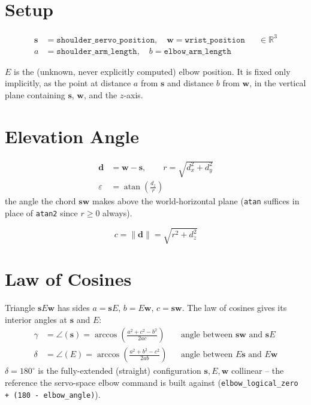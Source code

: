 \documentclass[11pt,a4paper]{article}
\begin{document}
\section{Setup}

\begin{align*}
\mathbf s &= \texttt{shoulder\_servo\_position}, \quad
\mathbf w = \texttt{wrist\_position} &&\in \mathbb R^3\\
a &= \texttt{shoulder\_arm\_length}, \quad
b = \texttt{elbow\_arm\_length}
\end{align*}

$E$ is the (unknown, never explicitly computed) elbow position. It is fixed only implicitly,
as the point at distance $a$ from $\mathbf s$ and distance $b$ from $\mathbf w$, in the vertical
plane containing $\mathbf s$, $\mathbf w$, and the $z$-axis.

\section{Elevation Angle}

\begin{align}
\mathbf d &= \mathbf w - \mathbf s, \qquad
r = \sqrt{d_x^2 + d_y^2} \\
\varepsilon &= \operatorname{atan}\!\left(\frac{d_z}{r}\right)
\end{align}
the angle the chord $\mathbf s\mathbf w$ makes above the world-horizontal plane (\texttt{atan}
suffices in place of \texttt{atan2} since $r \ge 0$ always).

\begin{equation}
c = \lVert \mathbf d \rVert = \sqrt{r^2 + d_z^2}
\end{equation}

\section{Law of Cosines}

Triangle $\mathbf s E \mathbf w$ has sides $a = \mathbf s E$, $b = E\mathbf w$,
$c = \mathbf s \mathbf w$. The law of cosines gives its interior angles at $\mathbf s$ and $E$:
\begin{align}
\gamma &= \angle(\mathbf s) = \arccos\!\left(\frac{a^2 + c^2 - b^2}{2ac}\right)
&&\text{angle between } \mathbf s\mathbf w \text{ and } \mathbf s E \\
\delta &= \angle(E) = \arccos\!\left(\frac{a^2 + b^2 - c^2}{2ab}\right)
&&\text{angle between } E\mathbf s \text{ and } E\mathbf w
\end{align}
$\delta = 180^\circ$ is the fully-extended (straight) configuration $\mathbf s, E, \mathbf w$
collinear -- the reference the servo-space elbow command is built against
(\texttt{elbow\_logical\_zero + (180 - elbow\_angle)}).
\end{document}
